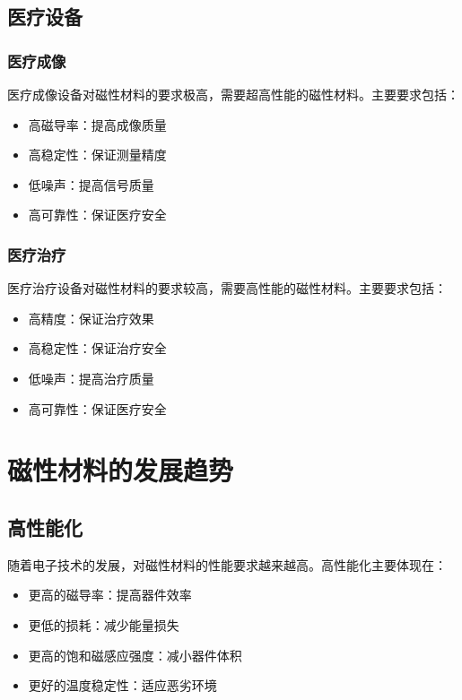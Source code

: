\documentclass[12pt,UTF8]{ctexbook}
\begin{document}
\section{医疗设备}

\subsection{医疗成像}

医疗成像设备对磁性材料的要求极高，需要超高性能的磁性材料。主要要求包括：

\begin{itemize}[leftmargin=2cm]
    \item 高磁导率：提高成像质量
    \item 高稳定性：保证测量精度
    \item 低噪声：提高信号质量
    \item 高可靠性：保证医疗安全
\end{itemize}

\subsection{医疗治疗}

医疗治疗设备对磁性材料的要求较高，需要高性能的磁性材料。主要要求包括：

\begin{itemize}[leftmargin=2cm]
    \item 高精度：保证治疗效果
    \item 高稳定性：保证治疗安全
    \item 低噪声：提高治疗质量
    \item 高可靠性：保证医疗安全
\end{itemize}

\chapter{磁性材料的发展趋势}

\section{高性能化}

随着电子技术的发展，对磁性材料的性能要求越来越高。高性能化主要体现在：

\begin{itemize}[leftmargin=2cm]
    \item 更高的磁导率：提高器件效率
    \item 更低的损耗：减少能量损失
    \item 更高的饱和磁感应强度：减小器件体积
    \item 更好的温度稳定性：适应恶劣环境
\end{itemize}
\end{document}
